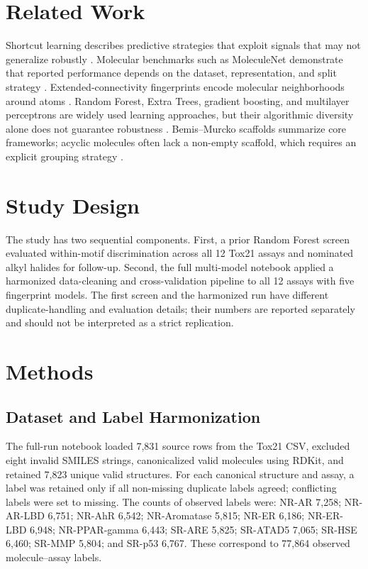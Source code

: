 \documentclass[conference]{IEEEtran}
\begin{document}
\section{Related Work}
Shortcut learning describes predictive strategies that exploit signals that may not generalize robustly \cite{geirhos2020}. Molecular benchmarks such as MoleculeNet demonstrate that reported performance depends on the dataset, representation, and split strategy \cite{wu2018}. Extended-connectivity fingerprints encode molecular neighborhoods around atoms \cite{rogers2010}. Random Forest, Extra Trees, gradient boosting, and multilayer perceptrons are widely used learning approaches, but their algorithmic diversity alone does not guarantee robustness \cite{breiman2001,geurts2006,chen2016,ke2017}. Bemis--Murcko scaffolds summarize core frameworks; acyclic molecules often lack a non-empty scaffold, which requires an explicit grouping strategy \cite{bemis1996}.

\section{Study Design}
The study has two sequential components. First, a prior Random Forest screen evaluated within-motif discrimination across all 12 Tox21 assays and nominated alkyl halides for follow-up. Second, the full multi-model notebook applied a harmonized data-cleaning and cross-validation pipeline to all 12 assays with five fingerprint models. The first screen and the harmonized run have different duplicate-handling and evaluation details; their numbers are reported separately and should not be interpreted as a strict replication.

\section{Methods}
\subsection{Dataset and Label Harmonization}
The full-run notebook loaded 7,831 source rows from the Tox21 CSV, excluded eight invalid SMILES strings, canonicalized valid molecules using RDKit, and retained 7,823 unique valid structures. For each canonical structure and assay, a label was retained only if all non-missing duplicate labels agreed; conflicting labels were set to missing. The counts of observed labels were: NR-AR 7,258; NR-AR-LBD 6,751; NR-AhR 6,542; NR-Aromatase 5,815; NR-ER 6,186; NR-ER-LBD 6,948; NR-PPAR-gamma 6,443; SR-ARE 5,825; SR-ATAD5 7,065; SR-HSE 6,460; SR-MMP 5,804; and SR-p53 6,767. These correspond to 77,864 observed molecule--assay labels.
\end{document}

